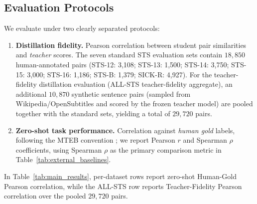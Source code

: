 \documentclass[10pt,journal,compsoc]{IEEEtran}
\begin{document}
\subsection{Evaluation Protocols}
We evaluate under two clearly separated protocols:
\begin{enumerate}
    \item \textbf{Distillation fidelity.} Pearson correlation between student pair similarities and \emph{teacher} scores. The seven standard STS evaluation sets contain $18{,}850$ human-annotated pairs (STS-12: 3,108; STS-13: 1,500; STS-14: 3,750; STS-15: 3,000; STS-16: 1,186; STS-B: 1,379; SICK-R: 4,927). For the teacher-fidelity distillation evaluation (ALL-STS teacher-fidelity aggregate), an additional $10{,}870$ synthetic sentence pairs (sampled from Wikipedia/OpenSubtitles and scored by the frozen teacher model) are pooled together with the standard sets, yielding a total of $29{,}720$ pairs.
    \item \textbf{Zero-shot task performance.} Correlation against \emph{human gold} labels, following the MTEB convention \cite{muennighoff2022mteb}; we report Pearson $r$ and Spearman $\rho$ coefficients, using Spearman $\rho$ as the primary comparison metric in Table~\ref{tab:external_baselines}.
\end{enumerate}
In Table~\ref{tab:main_results}, per-dataset rows report zero-shot Human-Gold Pearson correlation, while the ALL-STS row reports Teacher-Fidelity Pearson correlation over the pooled $29{,}720$ pairs.
\end{document}
